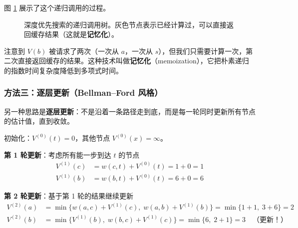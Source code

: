 图 \ref{fig:dfs-tree} 展示了这个递归调用的过程。

\begin{figure}[htbp]
\centering
{}
\caption{深度优先搜索的递归调用树。灰色节点表示已经计算过，可以直接返回缓存结果（这就是\textbf{记忆化}）。}
\label{fig:dfs-tree}
\end{figure}

\begin{remark}
注意到 $V(b)$ 被请求了两次（一次从 $a$，一次从 $s$），但我们只需要计算一次，第二次直接返回缓存的结果。这种技术叫做\textbf{记忆化}（memoization），它把朴素递归的指数时间复杂度降低到多项式时间。
\end{remark}

\subsubsection{方法三：逐层更新（Bellman--Ford 风格）}

另一种思路是\textbf{逐层更新}：不是沿着一条路径走到底，而是每一轮同时更新所有节点的估计值，直到收敛。

初始化：$V^{(0)}(t) = 0$，其他节点 $V^{(0)}(x) = \infty$。

\textbf{第 1 轮更新}：考虑所有能一步到达 $t$ 的节点
\begin{align*}
    V^{(1)}(c) &= w(c,t) + V^{(0)}(t) = 1 + 0 = 1 \\
    V^{(1)}(b) &= w(b,t) + V^{(0)}(t) = 6 + 0 = 6
\end{align*}

\textbf{第 2 轮更新}：基于第 1 轮的结果继续更新
\begin{align*}
    V^{(2)}(a) &= \min\{w(a,c) + V^{(1)}(c), \; w(a,b) + V^{(1)}(b)\} = \min\{1+1, \; 3+6\} = 2 \\
    V^{(2)}(b) &= \min\{V^{(1)}(b), \; w(b,c) + V^{(1)}(c)\} = \min\{6, \; 2+1\} = 3 \quad \text{（更新！）}
\end{align*}

